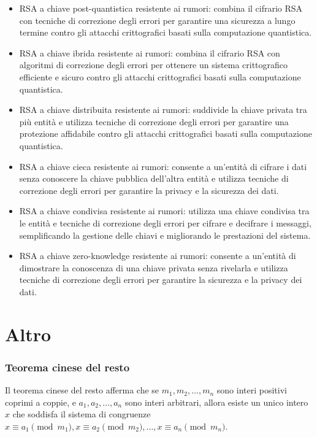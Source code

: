\documentclass[a4paper,12pt]{report}
\begin{document}
\begin{itemize}
    \item RSA a chiave post-quantistica resistente ai rumori: combina il cifrario RSA con tecniche di correzione degli errori per garantire una sicurezza a lungo termine contro gli attacchi crittografici basati sulla computazione quantistica.
    \item RSA a chiave ibrida resistente ai rumori: combina il cifrario RSA con algoritmi di correzione degli errori per ottenere un sistema crittografico efficiente e sicuro contro gli attacchi crittografici basati sulla computazione quantistica.
    \item RSA a chiave distribuita resistente ai rumori: suddivide la chiave privata tra più entità e utilizza tecniche di correzione degli errori per garantire una protezione affidabile contro gli attacchi crittografici basati sulla computazione quantistica.
    \item RSA a chiave cieca resistente ai rumori: consente a un'entità di cifrare i dati senza conoscere la chiave pubblica dell'altra entità e utilizza tecniche di correzione degli errori per garantire la privacy e la sicurezza dei dati.
    \item RSA a chiave condivisa resistente ai rumori: utilizza una chiave condivisa tra le entità e tecniche di correzione degli errori per cifrare e decifrare i messaggi, semplificando la gestione delle chiavi e migliorando le prestazioni del sistema.
    \item RSA a chiave zero-knowledge resistente ai rumori: consente a un'entità di dimostrare la conoscenza di una chiave privata senza rivelarla e utilizza tecniche di correzione degli errori per garantire la sicurezza e la privacy dei dati.
\end{itemize}

\chapter{Altro}

\subsection*{Teorema cinese del resto}
Il teorema cinese del resto afferma che se \( m_1, m_2, \ldots, m_n \) sono interi positivi coprimi a coppie, e \( a_1, a_2, \ldots, a_n \) sono interi arbitrari, allora esiste un unico intero \( x \) che soddisfa il sistema di congruenze \( x \equiv a_1 \pmod{m_1}, x \equiv a_2 \pmod{m_2}, \ldots, x \equiv a_n \pmod{m_n} \).
\end{document}
